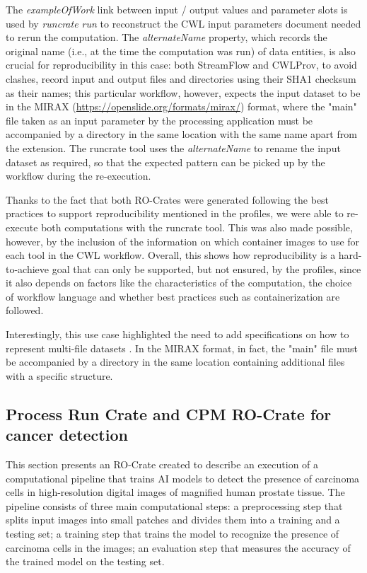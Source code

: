 \documentclass[10pt,letterpaper]{article}
\begin{document}
The \emph{exampleOfWork} link between input / output values and parameter slots is used by \emph{runcrate run} to reconstruct the CWL input parameters document needed to rerun the computation.
The
\emph{alternateName} property, which records the original name (i.e., at the time the computation was run) of data entities, is also crucial for reproducibility in this case: both StreamFlow and CWLProv, to avoid clashes, record input and output files and directories using their SHA1
checksum as their names; this particular workflow, however, expects the input dataset to be in the MIRAX (\url{https://openslide.org/formats/mirax/}) format, where the "main" file taken as an input parameter by the processing application must be accompanied by a directory in the same location with the same name apart from the extension.
The runcrate tool uses the \emph{alternateName} to rename the input dataset as required, so that the expected pattern can be picked up by the workflow during the re-execution.

Thanks to the fact that both RO-Crates were generated following the best practices to support reproducibility mentioned in the profiles, we were able to re-execute both computations with the runcrate tool.
This was also made possible, however, by the inclusion of the information on which container images to use for each tool in the CWL workflow.
Overall, this shows how reproducibility is a hard-to-achieve goal that can only be supported, but not ensured, by the profiles, since it also depends on factors like the characteristics of the computation, the choice of workflow language and whether best practices such as containerization are followed.

Interestingly, this use case highlighted the need to add specifications on how to represent multi-file datasets \cite[section Representing multi-file objects]{Workflow Run RO-Crate working group 2023a}. In the MIRAX format, in fact, the "main" file must be accompanied by a directory in the same location containing additional files with a specific structure.

\subsection{Process Run Crate and CPM RO-Crate for cancer detection}\label{process-run-crate-and-cpm-ro-crate-for-cancer-detection}

This section presents an RO-Crate created to describe an execution of a computational pipeline that trains AI models to detect the presence of carcinoma cells in high-resolution digital images of magnified human prostate tissue.
The pipeline consists of three main computational steps: a preprocessing step that splits input images into small patches and divides them into a training and a testing set; a training step that trains the model to recognize the presence of carcinoma cells in the images; an evaluation step that measures the accuracy of the trained model on the testing set.
\end{document}
